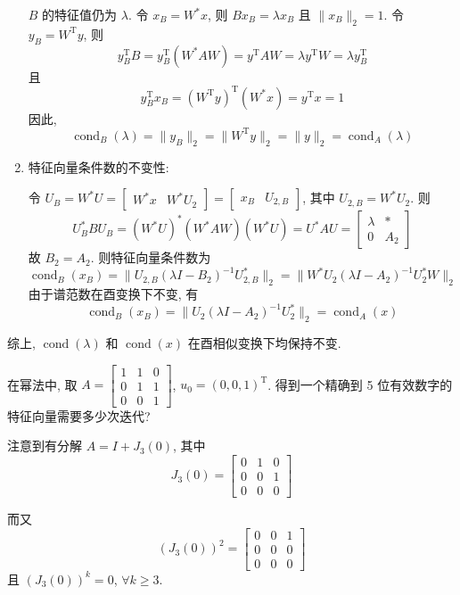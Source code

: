 \documentclass[12pt, answers]{exam}     %
\newcommand{\T}{\mathrm{T}}
\begin{document}
\begin{questions}
\begin{solution}
\begin{enumerate}
    \(B\) 的特征值仍为 \(\lambda\). 令 \(x_B = W^* x\), 则 \(B x_B = \lambda x_B\) 且 \(\|x_B\|_2 = 1\). 令 \(y_B = W^{\T} y\), 则
    \[
    y_B^{\T} B = y_B^{\T} (W^* A W)  = y^{\T} A W = \lambda y^{\T} W = \lambda y_B^{\T}
    \]
    且
    \[
    y_B^{\T} x_B = (W^{\T} y)^{\T} (W^{*} x) = y^{\T} x = 1
    \]
    因此, 
    \[
    \operatorname{cond}_B(\lambda) = \|y_B\|_2 = \|W^{\T} y\|_2 = \|y\|_2 = \operatorname{cond}_A(\lambda)
    \]
    
    \item 特征向量条件数的不变性:
    
    令 \(U_B = W^* U = \begin{bmatrix} W^* x & W^* U_2 \end{bmatrix} = \begin{bmatrix} x_B & U_{2, B} \end{bmatrix}\), 其中 \(U_{2, B} = W^* U_2\). 则
    \[
    U_B^* B U_B = (W^* U)^* (W^* A W) (W^* U) = U^* A U = \begin{bmatrix} \lambda & * \\ 0 & A_2 \end{bmatrix}
    \]
    故 \(B_2 = A_2\). 则特征向量条件数为
    \[
    \operatorname{cond}_B(x_B) = \| U_{2, B} (\lambda I - B_2)^{-1} U_{2, B}^* \|_2 = \| W^* U_2 (\lambda I - A_2)^{-1} U_2^* W \|_2
    \]
    由于谱范数在酉变换下不变, 有
    \[
    \operatorname{cond}_B(x_B) = \| U_2 (\lambda I - A_2)^{-1} U_2^* \|_2 = \operatorname{cond}_A(x)
    \]
\end{enumerate}
综上, \(\operatorname{cond}(\lambda)\) 和 \(\operatorname{cond}(x)\) 在酉相似变换下均保持不变. 

\end{solution}


\question{}在幂法中, 取 \( A = \begin{bmatrix} 1 & 1 & 0 \\ 0 & 1 & 1 \\ 0 & 0 & 1 \end{bmatrix} \), \( u_0 = (0, 0, 1)^{\T} \). 
得到一个精确到 5 位有效数字的特征向量需要多少次迭代?

\begin{solution}注意到有分解 \( A = I + J_3(0) \), 其中
\[
J_3(0) = \begin{bmatrix} 0 & 1 & 0 \\ 0 & 0 & 1 \\ 0 & 0 & 0 \end{bmatrix}
\]

而又
\[
(J_3(0))^2 = \begin{bmatrix} 0 & 0 & 1 \\ 0 & 0 & 0 \\ 0 & 0 & 0 \end{bmatrix}
\]
且 \( (J_3(0))^k = 0 \), \( \forall k \geq 3 \). 


\end{solution}
\end{questions}
\end{document}
